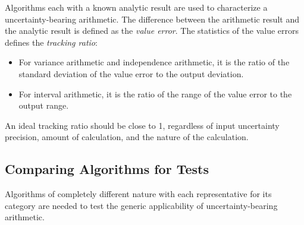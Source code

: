 \documentclass[twoside]{article}
\numberwithin{equation}{section}
\begin{document}
Algorithms each with a known analytic result are used to characterize a uncertainty-bearing arithmetic. 
The difference between the arithmetic result and the analytic result is defined as the \emph{value error}.
The statistics of the value errors defines the \emph{tracking ratio}:
\begin{itemize}
\item For variance arithmetic and independence arithmetic, it is the ratio of the standard deviation of the value error to the output deviation.

\item For interval arithmetic, it is the ratio of the range of the value error to the output range.
\end{itemize}
An ideal tracking ratio should be close to 1, regardless of input uncertainty precision, amount of calculation, and the nature of the calculation.




\subsection{Comparing Algorithms for Tests}

Algorithms of completely different nature with each representative for its category are needed to test the generic applicability of uncertainty-bearing arithmetic.  
\end{document}
